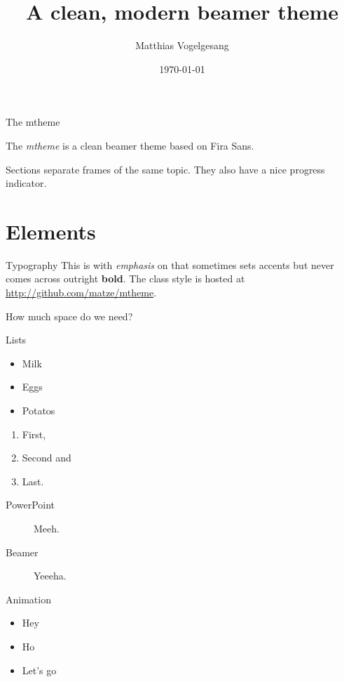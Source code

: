 \documentclass[compress]{beamer}
\title{A clean, modern beamer theme}
\subtitle{}
\date{\today}
\author{Matthias Vogelgesang}
\institute{Institute for foo bar}
\begin{document}
\maketitle

\begin{frame}{The mtheme}

  The \emph{mtheme} is a clean beamer theme based on Fira Sans.

  Sections separate frames of the same topic. They also have a nice progress
  indicator.

\end{frame}

\section{Elements}

\begin{frame}{Typography}
  This is with \emph{emphasis} on that sometimes sets \alert{accents} but never
  comes across outright \textbf{bold}. The class style is hosted at
  \url{http://github.com/matze/mtheme}.

  How much space do we need?
\end{frame}

\begin{frame}{Lists}
  \begin{itemize}
    \item Milk
    \item Eggs
    \item Potatos
  \end{itemize}

  \begin{enumerate}
    \item First,
    \item Second and
    \item Last.
  \end{enumerate}

  \begin{description}
    \item[PowerPoint] Meeh.
    \item[Beamer] Yeeeha.
  \end{description}
\end{frame}

\begin{frame}{Animation}
  \begin{itemize}[<+- | alert@+>]
    \item \alert<4>{Hey}
    \item Ho
    \item Let's go
  \end{itemize}
\end{frame}
\end{document}
